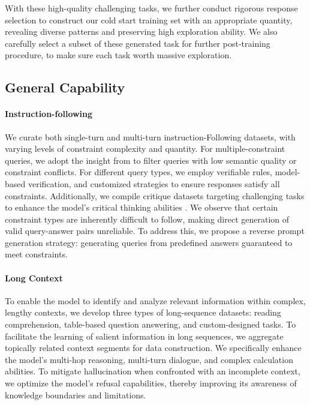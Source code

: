 \documentclass{article}
\begin{document}
With these high-quality challenging tasks, we further conduct rigorous response selection to construct our cold start training set with an appropriate quantity, revealing diverse patterns and preserving high exploration ability. We also carefully select a subset of these generated task for further post-training procedure, to make sure each task worth massive exploration.



\subsection{General Capability}

\paragraph{Instruction-following} 

We curate both single-turn and multi-turn instruction-Following datasets, with varying levels of constraint complexity and quantity. For multiple-constraint queries, we adopt the insight from \citet{ye2025multi} to filter queries with low semantic quality or constraint conflicts. For different query types, we employ verifiable rules, model-based verification, and customized strategies to ensure responses satisfy all constraints. Additionally, we compile critique datasets targeting challenging tasks to enhance the model's critical thinking abilities \citep{Critique_ft}. We observe that certain constraint types are inherently difficult to follow, making direct generation of valid query-answer pairs unreliable. To address this, we propose a reverse prompt generation strategy: generating queries from predefined answers guaranteed to meet constraints. 



\paragraph{Long Context}
To enable the model to identify and analyze relevant information within complex, lengthy contexts, we develop three types of long-sequence datasets: reading comprehension, table-based question answering, and custom-designed tasks. 
To facilitate the learning of salient information in long sequences, we aggregate topically related context segments for data construction.
We specifically enhance the model’s multi-hop reasoning, multi-turn dialogue, and complex calculation abilities. To mitigate hallucination when confronted with an incomplete context, we optimize the model’s refusal capabilities, thereby improving its awareness of knowledge boundaries and limitations.
\end{document}
